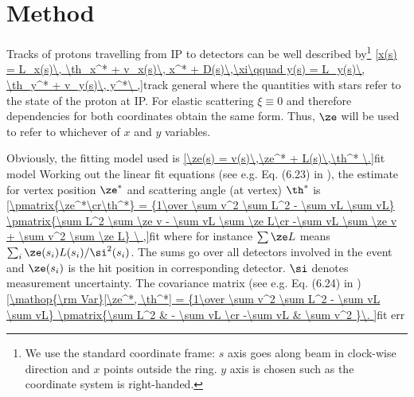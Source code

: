 


\section[method]{Method}
Tracks of protons travelling from IP to detectors can be well described by\footnote{We use the standard coordinate frame: $s$ axis goes along beam in clock-wise direction and $x$ points outside the ring. $y$ axis is chosen such as the coordinate system is right-handed.}
\eqref{x(s) = L_x(s)\, \th_x^* + v_x(s)\, x^* + D(s)\,\xi\qquad y(s) = L_y(s)\, \th_y^* + v_y(s)\, y^*\ ,}{track general}
where the quantities with stars refer to the state of the proton at IP. For elastic scattering $\xi\equiv 0$ and therefore dependencies for both coordinates obtain the same form. Thus, $\ze$ will be used to refer to whichever of $x$ and $y$ variables.

Obviously, the fitting model used is
\eqref{\ze(s) = v(s)\,\ze^* + L(s)\,\th^* \.}{fit model}
Working out the linear fit equations (see e.g. Eq. (6.23) in ), the estimate for vertex position $\ze^*$ and scattering angle (at vertex) $\th^*$ is
\eqref{\pmatrix{\ze^*\cr\th^*} = {1\over \sum v^2 \sum L^2 - \sum vL \sum vL} \pmatrix{\sum L^2 \sum \ze v - \sum vL \sum \ze L\cr -\sum vL \sum \ze v + \sum v^2 \sum \ze L} \ ,}{fit}
where for instance $\sum \ze L$ means $\sum_{i} \ze(s_i) L(s_i) / \si^2(s_i)$. The sums go over all detectors involved in the event and $\ze(s_i)$ is the hit position in corresponding detector. $\si$ denotes measurement uncertainty. The covariance matrix (see e.g. Eq. (6.24) in )
\eqref{\mathop{\rm Var}[\ze^*, \th^*] = {1\over \sum v^2 \sum L^2 - \sum vL \sum vL} \pmatrix{\sum L^2 & - \sum vL \cr -\sum vL & \sum v^2 }\.
}{fit err}

\iffalse
In case of symmetric optic, i.e.
$$L(-s) = - L(s),\qquad v(-s) = v(s)\eqno(3)$$
and symmetric measurement (simultaneously at $\pm 216$ and/or $\pm220$) one gets condition $\sum Lv = 0$. It simplifies the general formula (2) to
$$\pmatrix{\ze^*\cr\th^*} = \pmatrix{\sum \ze v / \sum v^2\cr \sum \ze L / \sum L^2}.\eqno{(4)}$$
The expression for $\th^*$ can be further expanded
$$\th^* = {1\over 2} {L(216) \big(\ze(216) - \ze(-216)\big)\ +\ L(220)\big( \ze(220) - \ze(-220) \big) \over L^2(216) + L^2(220)}\eqno{(5)}$$
\fi

